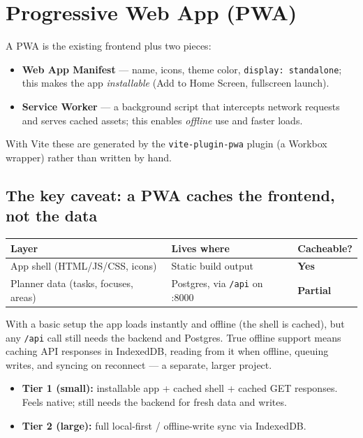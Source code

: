 \documentclass[11pt,a4paper]{article}
\newcommand{\yes}{\textcolor{ok}{\textbf{Yes}}}
\newcommand{\maybe}{\textcolor{warn}{\textbf{Partial}}}
\begin{document}
\section{Progressive Web App (PWA)}

A PWA is the existing frontend plus two pieces:

\begin{itemize}
  \item \textbf{Web App Manifest} --- name, icons, theme color, \texttt{display: standalone};
        this makes the app \emph{installable} (Add to Home Screen, fullscreen launch).
  \item \textbf{Service Worker} --- a background script that intercepts network
        requests and serves cached assets; this enables \emph{offline} use and faster loads.
\end{itemize}

With Vite these are generated by the \texttt{vite-plugin-pwa} plugin
(a Workbox wrapper) rather than written by hand.

\subsection{The key caveat: a PWA caches the frontend, not the data}

\begin{center}
\renewcommand{\arraystretch}{1.35}
\begin{tabularx}{\textwidth}{>{\raggedright\arraybackslash}p{4.2cm} >{\raggedright\arraybackslash}X >{\centering\arraybackslash}p{3.2cm}}
\toprule
\textbf{Layer} & \textbf{Lives where} & \textbf{Cacheable?} \\
\midrule
App shell (HTML/JS/CSS, icons) & Static build output & \yes \\
Planner data (tasks, focuses, areas) & Postgres, via \texttt{/api} on :8000 & \maybe \\
\bottomrule
\end{tabularx}
\end{center}

With a basic setup the app loads instantly and offline (the shell is cached),
but any \texttt{/api} call still needs the backend and Postgres. True offline
support means caching API responses in IndexedDB, reading from it when offline,
queuing writes, and syncing on reconnect --- a separate, larger project.

\begin{itemize}
  \item \textbf{Tier 1 (small):} installable app + cached shell + cached GET responses.
        Feels native; still needs the backend for fresh data and writes.
  \item \textbf{Tier 2 (large):} full local-first / offline-write sync via IndexedDB.
\end{itemize}
\end{document}
